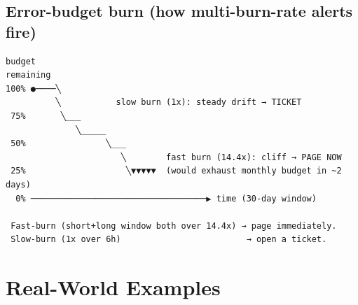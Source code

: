 \documentclass[11pt]{article}
\begin{document}
\subsection{Error-budget burn (how multi-burn-rate alerts fire)}\label{error-budget-burn-how-multi-burn-rate-alerts-fire}

\setcodelang{}

\begin{verbatim}
budget
remaining
100% ●────╲
          ╲           slow burn (1x): steady drift → TICKET
 75%       ╲___
              ╲_____
 50%                ╲___
                       ╲        fast burn (14.4x): cliff → PAGE NOW
 25%                    ╲▼▼▼▼▼  (would exhaust monthly budget in ~2 days)
  0% ───────────────────────────────────▶ time (30-day window)

 Fast-burn (short+long window both over 14.4x) → page immediately.
 Slow-burn (1x over 6h)                         → open a ticket.
\end{verbatim}

\section{Real-World Examples}\label{real-world-examples}
\end{document}
